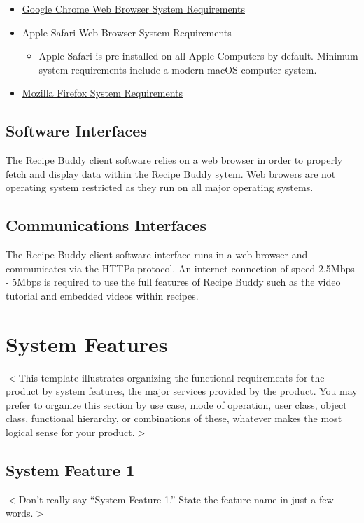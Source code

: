 \documentclass{scrreprt}
\begin{document}
\begin{itemize}
    \item \href{https://support.google.com/chrome/a/answer/7100626?hl=en}{Google Chrome Web Browser System Requirements}
    \item Apple Safari Web Browser System Requirements
    \begin{itemize}
        \item Apple Safari is pre-installed on all Apple Computers by default. Minimum system requirements include a modern macOS computer system.
    \end{itemize}
    \item \href{https://www.mozilla.org/en-US/firefox/92.0.1/system-requirements/}{Mozilla Firefox System Requirements}
\end{itemize}

\section{Software Interfaces}
The Recipe Buddy client software relies on a web browser in order to properly fetch and display data within the Recipe Buddy sytem. Web browers are not operating system restricted as they run on all major operating systems.

\section{Communications Interfaces}
The Recipe Buddy client software interface runs in a web browser and communicates via the HTTPs protocol. An internet connection of speed 2.5Mbps - 5Mbps is required to use the full features of Recipe Buddy such as the video tutorial and embedded videos within recipes.

\chapter{System Features}
$<$This template illustrates organizing the functional requirements for the 
product by system features, the major services provided by the product. You may 
prefer to organize this section by use case, mode of operation, user class, 
object class, functional hierarchy, or combinations of these, whatever makes the 
most logical sense for your product.$>$

\section{System Feature 1}
$<$Don’t really say “System Feature 1.” State the feature name in just a few 
words.$>$
\end{document}
